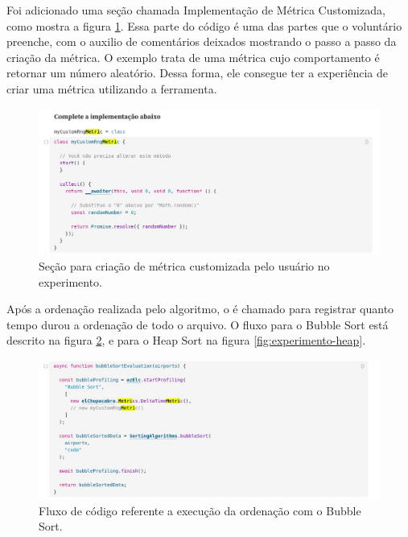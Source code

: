 \documentclass[12pt]{tcc}
\begin{document}
Foi adicionado uma seção chamada Implementação de Métrica Customizada, como mostra a figura \ref{fig:metrica-observable}. Essa parte do código é uma das partes que o voluntário preenche, com o auxilio de comentários deixados mostrando o passo a passo da criação da métrica. O exemplo trata de uma métrica cujo comportamento é retornar um número aleatório. Dessa forma, ele consegue ter a experiência de criar uma métrica utilizando a ferramenta.

\begin{figure}[!ht]
	\centering
	\includegraphics[width=1\textwidth]{figures/experimento-metrica.jpeg}
	\caption{Seção para criação de métrica customizada pelo usuário no experimento.}
	\label{fig:metrica-observable}
\end{figure}


Após a ordenação realizada pelo algoritmo, o  é chamado para registrar quanto tempo durou a ordenação de todo o arquivo. O fluxo para o Bubble Sort está descrito na figura \ref{fig:experimento-bubble}, e para o Heap Sort na figura \ref{fig:experimento-heap}.

\begin{figure}[!ht]
	\centering
	\includegraphics[width=1\textwidth]{figures/experimento-bubble.jpeg}
	\caption{Fluxo de código referente a execução da ordenação com o Bubble Sort.}
	\label{fig:experimento-bubble}
\end{figure}
\end{document}
